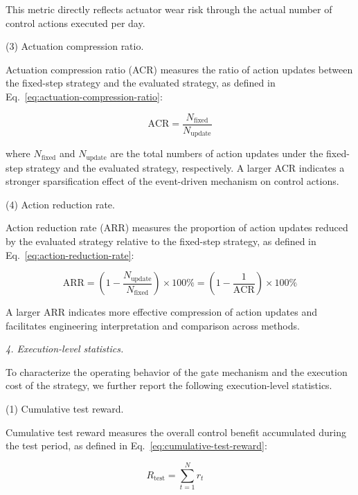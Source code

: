 ﻿\documentclass[preprint,12pt,number]{elsarticle}
\begin{document}
This metric directly reflects actuator wear risk through the actual number of control actions executed per day.

\par\smallskip
\noindent (3) Actuation compression ratio.
\par\nobreak\noindent Actuation compression ratio (ACR) measures the ratio of action updates between the fixed-step strategy and the evaluated strategy, as defined in Eq.~\eqref{eq:actuation-compression-ratio}:

\[
\mathrm{ACR} = \frac{N_{\text{fixed}}}{N_{\text{update}}} \tag{32}\label{eq:actuation-compression-ratio}
\]

\noindent where \(N_{\text{fixed}}\) and \(N_{\text{update}}\) are the total numbers of action updates under the fixed-step strategy and the evaluated strategy, respectively. A larger ACR indicates a stronger sparsification effect of the event-driven mechanism on control actions.

\par\smallskip
\noindent (4) Action reduction rate.
\par\nobreak\noindent Action reduction rate (ARR) measures the proportion of action updates reduced by the evaluated strategy relative to the fixed-step strategy, as defined in Eq.~\eqref{eq:action-reduction-rate}:

\[
\mathrm{ARR}=\left(1-\frac{N_{\text{update}}}{N_{\text{fixed}}}\right)\times 100\% = \left(1-\frac{1}{\mathrm{ACR}}\right)\times 100\% \tag{33}\label{eq:action-reduction-rate}
\]

A larger ARR indicates more effective compression of action updates and facilitates engineering interpretation and comparison across methods.

\par\medskip
\noindent\textit{4. Execution-level statistics.}\label{execution-level-statistics}
\par\smallskip

To characterize the operating behavior of the gate mechanism and the execution cost of the strategy, we further report the following execution-level statistics.

\par\smallskip
\noindent (1) Cumulative test reward.
\par\nobreak\noindent Cumulative test reward measures the overall control benefit accumulated during the test period, as defined in Eq.~\eqref{eq:cumulative-test-reward}:

\[
R_{\text{test}} = \sum_{t=1}^{N} r_t \quad \tag{34}\label{eq:cumulative-test-reward}
\]
\end{document}
